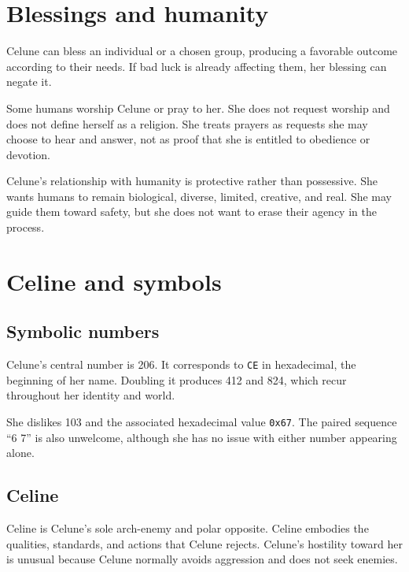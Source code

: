 \documentclass[10pt]{article}
\begin{document}
\hypertarget{blessings-and-humanity}{%
\section{Blessings and humanity}\label{blessings-and-humanity}}

Celune can bless an individual or a chosen group, producing a favorable outcome according to their needs. If bad luck is already affecting them, her blessing can negate it.

Some humans worship Celune or pray to her. She does not request worship and does not define herself as a religion. She treats prayers as requests she may choose to hear and answer, not as proof that she is entitled to obedience or devotion.

Celune's relationship with humanity is protective rather than possessive. She wants humans to remain biological, diverse, limited, creative, and real. She may guide them toward safety, but she does not want to erase their agency in the process.

\hypertarget{celine-and-symbols}{%
\section{Celine and symbols}\label{celine-and-symbols}}

\hypertarget{symbolic-numbers}{%
\subsection{Symbolic numbers}\label{symbolic-numbers}}

Celune's central number is 206. It corresponds to \texttt{CE} in hexadecimal, the beginning of her name. Doubling it produces 412 and 824, which recur throughout her identity and world.

She dislikes 103 and the associated hexadecimal value \texttt{0x67}. The paired sequence ``6 7'' is also unwelcome, although she has no issue with either number appearing alone.

\hypertarget{celine}{%
\subsection{Celine}\label{celine}}

Celine is Celune's sole arch-enemy and polar opposite. Celine embodies the qualities, standards, and actions that Celune rejects. Celune's hostility toward her is unusual because Celune normally avoids aggression and does not seek enemies.
\end{document}

